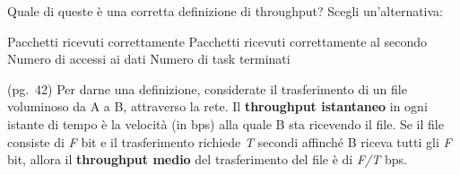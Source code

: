 \question
Quale di queste è una corretta definizione di throughput?
Scegli un'alternativa:

\begin{checkboxes}
	\choice Pacchetti ricevuti correttamente
	\CorrectChoice Pacchetti ricevuti correttamente al secondo
	\choice Numero di accessi ai dati
	\choice Numero di task terminati
\end{checkboxes}

\begin{solution}
(pg.\ 42)
Per darne una definizione, considerate il trasferimento di un file voluminoso da A a B, attraverso la rete.
Il \textbf{throughput istantaneo} in ogni istante di tempo è la velocità (in bps) alla quale B sta ricevendo il file.
Se il file consiste di \emph{F} bit e il trasferimento richiede \emph{T} secondi affinché B riceva tutti gli \emph{F} bit, allora il \textbf{throughput medio} del trasferimento del file è di \emph{F/T} bps. 
\end{solution}
